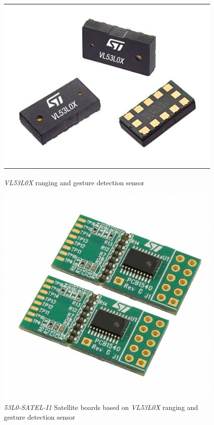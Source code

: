 \begin{figure}
	\centering
	\begin{minipage}{0.4\textwidth}
		\includegraphics[width=0.9\linewidth]{pictures/vl53l0x_article2.jpg}
		\caption{\textit{VL53L0X} ranging and gesture detection sensor}
		\label{fig:sensor}
	\end{minipage}
	\quad
	\begin{minipage}{0.4\textwidth}
		\includegraphics[width=0.9\linewidth]{pictures/53L0-SATEL-I1.jpg}
		\caption{\textit{53L0-SATEL-I1} Satellite boards based on \textit{VL53L0X} ranging and gesture detection sensor}
		\label{fig:satellite}
	\end{minipage}
\end{figure}
